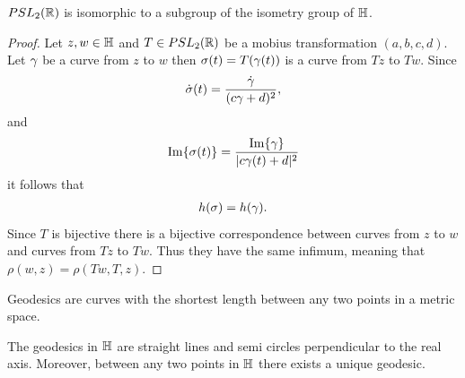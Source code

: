 \begin{theorem}
  $PSL_2(\mathbb{R})$ is isomorphic to a subgroup of the isometry group of $\mathbb{H}$.
\end{theorem}
\begin{proof}
  Let $z,w\in \mathbb{H}$ and $T\in PSL_2(\mathbb{R})$ be a mobius transformation $(a,b,c,d)$. Let $\gamma$ be a curve from $z$ to $w$ then $\sigma(t) = T(\gamma(t))$ is a curve from $Tz$ to $Tw$. Since
  \begin{align*}
    \dot{\sigma}(t) = \frac{\dot{\gamma}}{(c\gamma + d)^2},
  \end{align*}
  and
  \begin{align*}
    \Im{\sigma(t)} = \frac{\Im{\gamma}}{|c\gamma(t)+d|^2}
  \end{align*}
  it follows that
  \begin{align*}
    h(\sigma) = h(\gamma).
  \end{align*}
  Since $T$ is bijective there is a bijective correspondence between curves from $z$ to $w$ and curves from $Tz$ to $Tw$. Thus they have the same infimum, meaning that $\rho(w,z) = \rho(Tw,T,z)$. 
\end{proof}
\begin{definition}
  Geodesics are curves with the shortest length between any two points in a metric space.
\end{definition}
\begin{theorem}
  The geodesics in $\mathbb{H}$ are straight lines and semi circles perpendicular to the real axis. Moreover, between any two points in $\mathbb{H}$ there exists a unique geodesic.
\end{theorem}
